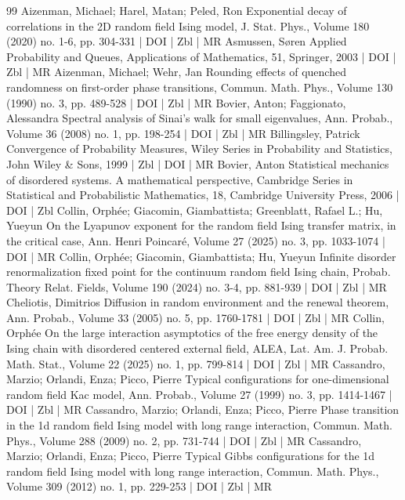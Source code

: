 \begin{thebibliography}{99}
 Aizenman, Michael; Harel, Matan; Peled, Ron Exponential decay of correlations in the 2D random field Ising model, J. Stat. Phys., Volume 180 (2020) no. 1-6, pp. 304-331 | DOI | Zbl | MR
 Asmussen, Søren Applied Probability and Queues, Applications of Mathematics, 51, Springer, 2003 | DOI | Zbl | MR
 Aizenman, Michael; Wehr, Jan Rounding effects of quenched randomness on first-order phase transitions, Commun. Math. Phys., Volume 130 (1990) no. 3, pp. 489-528 | DOI | Zbl | MR
 Bovier, Anton; Faggionato, Alessandra Spectral analysis of Sinai’s walk for small eigenvalues, Ann. Probab., Volume 36 (2008) no. 1, pp. 198-254 | DOI | Zbl | MR
 Billingsley, Patrick Convergence of Probability Measures, Wiley Series in Probability and Statistics, John Wiley \& Sons, 1999 | Zbl | DOI | MR
 Bovier, Anton Statistical mechanics of disordered systems. A mathematical perspective, Cambridge Series in Statistical and Probabilistic Mathematics, 18, Cambridge University Press, 2006 | DOI | Zbl
 Collin, Orphée; Giacomin, Giambattista; Greenblatt, Rafael L.; Hu, Yueyun On the Lyapunov exponent for the random field Ising transfer matrix, in the critical case, Ann. Henri Poincaré, Volume 27 (2025) no. 3, pp. 1033-1074 | DOI | MR
 Collin, Orphée; Giacomin, Giambattista; Hu, Yueyun Infinite disorder renormalization fixed point for the continuum random field Ising chain, Probab. Theory Relat. Fields, Volume 190 (2024) no. 3-4, pp. 881-939 | DOI | Zbl | MR
 Cheliotis, Dimitrios Diffusion in random environment and the renewal theorem, Ann. Probab., Volume 33 (2005) no. 5, pp. 1760-1781 | DOI | Zbl | MR
 Collin, Orphée On the large interaction asymptotics of the free energy density of the Ising chain with disordered centered external field, ALEA, Lat. Am. J. Probab. Math. Stat., Volume 22 (2025) no. 1, pp. 799-814 | DOI | Zbl | MR
 Cassandro, Marzio; Orlandi, Enza; Picco, Pierre Typical configurations for one-dimensional random field Kac model, Ann. Probab., Volume 27 (1999) no. 3, pp. 1414-1467 | DOI | Zbl | MR
 Cassandro, Marzio; Orlandi, Enza; Picco, Pierre Phase transition in the 1d random field Ising model with long range interaction, Commun. Math. Phys., Volume 288 (2009) no. 2, pp. 731-744 | DOI | Zbl | MR
 Cassandro, Marzio; Orlandi, Enza; Picco, Pierre Typical Gibbs configurations for the 1d random field Ising model with long range interaction, Commun. Math. Phys., Volume 309 (2012) no. 1, pp. 229-253 | DOI | Zbl | MR

\end{thebibliography}
